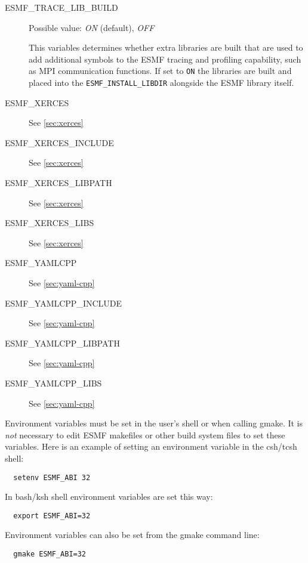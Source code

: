 \begin{description}
\item[ESMF\_TRACE\_LIB\_BUILD]
Possible value: {\em ON} (default), {\em OFF}

This variables determines whether extra libraries are built that are used
to add additional symbols to the ESMF tracing and profiling capability,
such as MPI communication functions.
If set to {\tt ON} the libraries are built and placed into the
{\tt ESMF\_INSTALL\_LIBDIR} alongside the ESMF library itself.

\item[ESMF\_XERCES]
See \ref{sec:xerces}

\item[ESMF\_XERCES\_INCLUDE]
See \ref{sec:xerces}

\item[ESMF\_XERCES\_LIBPATH]
See \ref{sec:xerces}

\item[ESMF\_XERCES\_LIBS]
See \ref{sec:xerces}

\item[ESMF\_YAMLCPP]
See \ref{sec:yaml-cpp}

\item[ESMF\_YAMLCPP\_INCLUDE]
See \ref{sec:yaml-cpp}

\item[ESMF\_YAMLCPP\_LIBPATH]
See \ref{sec:yaml-cpp}

\item[ESMF\_YAMLCPP\_LIBS]
See \ref{sec:yaml-cpp}

\end{description}

Environment variables must be set in the user's shell or when calling gmake. It
is {\em not} necessary to edit ESMF makefiles or other build system files to set
these variables. Here is an example of setting an environment variable in the
csh/tcsh shell:

\begin{verbatim}
  setenv ESMF_ABI 32
\end{verbatim}

In bash/ksh shell environment variables are set this way:

\begin{verbatim}
  export ESMF_ABI=32
\end{verbatim}

Environment variables can also be set from the gmake command line:

\begin{verbatim}
  gmake ESMF_ABI=32
\end{verbatim}

